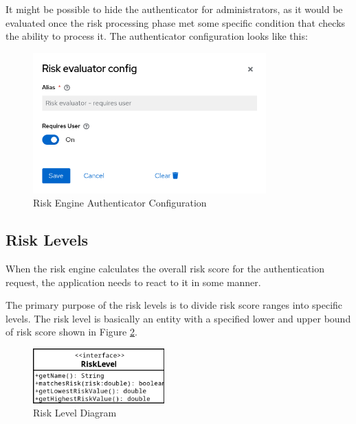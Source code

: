 It might be possible to hide the authenticator for administrators, as it would be evaluated once the risk processing phase met some specific condition that checks the ability to process it.
\newline
\newline
The authenticator configuration looks like this:

\begin{figure}[htbp]
  \centering
  \includegraphics[width=0.8\textwidth]{img/sections/5-design/risk-evaluator-authenticator-config.png}
  \caption{Risk Engine Authenticator Configuration}
  \label{fig:risk-evaluator-authenticator-config}
\end{figure}

\newpage

\subsection{Risk Levels} \label{risk-levels}
When the risk engine calculates the overall risk score for the authentication request, the application needs to react to it in some manner.

The primary purpose of the risk levels is to divide risk score ranges into specific levels.
The risk level is basically an entity with a specified lower and upper bound of risk score shown in Figure \ref{fig:risk-level-diagram}.

\begin{figure}[htbp]
  \centering
  \includegraphics[width=0.45\textwidth]{img/sections/5-design/risk-level.png}
  \caption{Risk Level Diagram}
  \label{fig:risk-level-diagram}
\end{figure}

